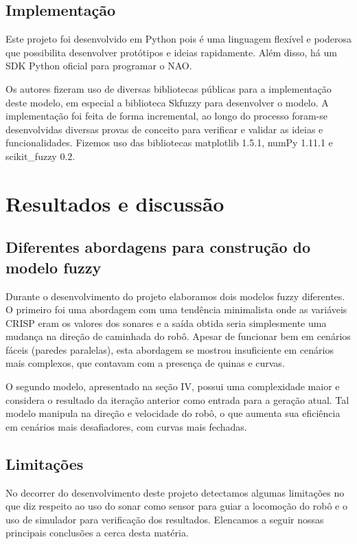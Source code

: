 \documentclass[twoside,conference,a4paper]{IEEEtran}
\begin{document}
\subsection{Implementação}
Este projeto foi desenvolvido em Python pois é uma linguagem flexível e poderosa que possibilita desenvolver protótipos e ideias rapidamente. Além disso, há um SDK Python oficial para programar o NAO. 

Os autores fizeram uso de diversas bibliotecas públicas para a implementação deste modelo, em especial a biblioteca Skfuzzy para desenvolver o modelo.  A implementação foi feita de forma incremental, ao longo do processo foram-se desenvolvidas diversas provas de conceito para verificar e validar as ideias e funcionalidades. Fizemos uso das bibliotecas matplotlib 1.5.1, numPy 1.11.1 e scikit\_fuzzy 0.2.


\section{Resultados e discussão}

\subsection{Diferentes abordagens para construção do modelo fuzzy}
Durante o desenvolvimento do projeto elaboramos dois modelos fuzzy diferentes. O primeiro foi uma abordagem com uma tendência minimalista onde as variáveis CRISP eram os valores dos sonares e a saída obtida seria simplesmente uma mudança na direção de caminhada do robô. Apesar de funcionar bem em cenários fáceis (paredes paralelas), esta abordagem se mostrou insuficiente em cenários mais complexos, que contavam com a presença de quinas e curvas.

O segundo modelo, apresentado na seção IV, possui uma complexidade maior e considera o resultado da iteração anterior como entrada para a geração atual. Tal modelo manipula na direção e velocidade do robô, o que aumenta sua eficiência em cenários mais desafiadores, com curvas mais fechadas.

\subsection{Limitações}
No decorrer do desenvolvimento deste projeto detectamos algumas limitações no que diz respeito ao uso do sonar como sensor para guiar a locomoção do robô e o uso de simulador para verificação dos resultados. Elencamos a seguir nossas principais conclusões a cerca desta matéria.
\end{document}
